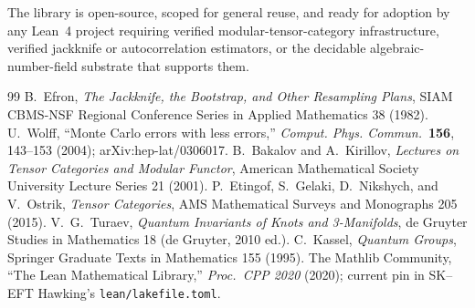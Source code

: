 \documentclass[11pt]{article}
\begin{document}
The library is open-source, scoped for general reuse, and ready
for adoption by any Lean~4 project requiring verified
modular-tensor-category infrastructure, verified jackknife or
autocorrelation estimators, or the decidable algebraic-number-field
substrate that supports them.


\begin{thebibliography}{99}
 B.~Efron, \emph{The Jackknife, the Bootstrap,
and Other Resampling Plans}, SIAM CBMS-NSF Regional Conference
Series in Applied Mathematics 38 (1982).
 U.~Wolff, ``Monte Carlo
errors with less errors,''
\emph{Comput. Phys. Commun.}\ \textbf{156}, 143--153 (2004);
arXiv:hep-lat/0306017.
 B.~Bakalov and A.~Kirillov,
\emph{Lectures on Tensor Categories and Modular Functor},
American Mathematical Society University Lecture Series 21 (2001).
 P.~Etingof, S.~Gelaki, D.~Nikshych, and
V.~Ostrik, \emph{Tensor Categories}, AMS Mathematical Surveys and
Monographs 205 (2015).
 V.~G.~Turaev, \emph{Quantum Invariants of Knots
and 3-Manifolds}, de Gruyter Studies in Mathematics 18 (de Gruyter,
2010 ed.).
 C.~Kassel, \emph{Quantum Groups}, Springer
Graduate Texts in Mathematics 155 (1995).
 The Mathlib Community, ``The Lean Mathematical
Library,'' \emph{Proc.\ CPP 2020} (2020); current pin in
SK--EFT Hawking's \texttt{lean/lakefile.toml}.
\end{thebibliography}




\end{document}
